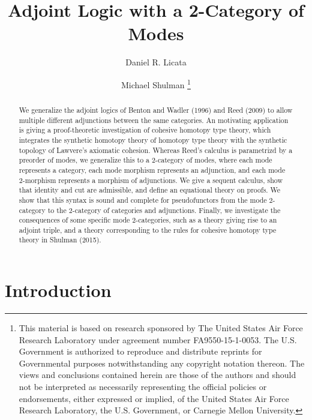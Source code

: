 \documentclass{drl-common/llncs}
\title{Adjoint Logic with a 2-Category of Modes}
\author{Daniel R. Licata\inst{1} \and Michael Shulman\inst{2}
\thanks{
This material is based on research sponsored by The United States Air
Force Research Laboratory under agreement number FA9550-15-1-0053. The
U.S. Government is authorized to reproduce and distribute reprints for
Governmental purposes notwithstanding any copyright notation thereon.
The views and conclusions contained herein are those of the authors and
should not be interpreted as necessarily representing the official
policies or endorsements, either expressed or implied, of the United
States Air Force Research Laboratory, the U.S. Government, or Carnegie
Mellon University.
}}
\institute{Wesleyan University \and University of San Diego}
\begin{document}
\maketitle

\begin{abstract}
We generalize the adjoint logics of Benton and Wadler (1996) and Reed
(2009) to allow multiple different adjunctions between the same
categories.  An motivating application is giving a proof-theoretic
investigation of cohesive homotopy type theory, which integrates the
synthetic homotopy theory of homotopy type theory with the synthetic
topology of Lawvere's axiomatic cohesion.  Whereas Reed's calculus is
parametrizd by a preorder of modes, we generalize this to a 2-category
of modes, where each mode represents a category, each mode morphism
represents an adjunction, and each mode 2-morphism represents a morphism
of adjunctions.  We give a sequent calculus, show that identity and cut
are admissible, and define an equational theory on proofs.  We show that
this syntax is sound and complete for pseudofunctors from the mode
2-category to the 2-category of categories and adjunctions.  Finally, we
investigate the consequences of some specific mode 2-categories, such as
a theory giving rise to an adjoint triple, and a theory corresponding to
the rules for cohesive homotopy type theory in Shulman (2015).
\end{abstract}

\section{Introduction}
\end{document}
